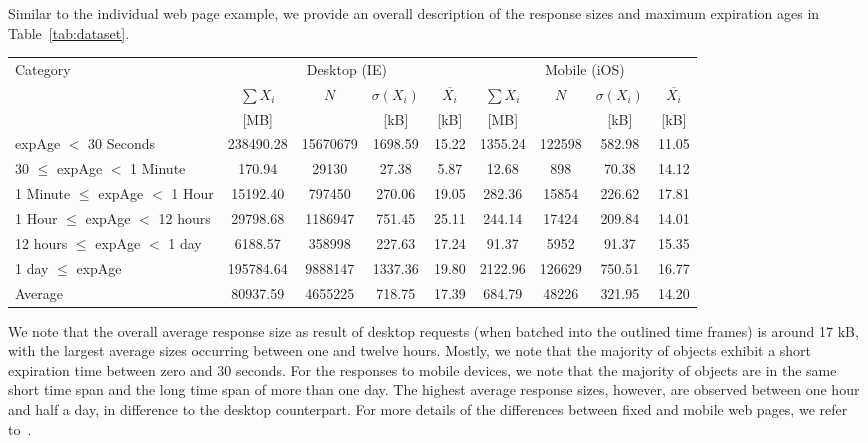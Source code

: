 Similar to the individual web page example, we provide an overall description of the response sizes and maximum expiration ages in Table~\ref{tab:dataset}.
\begin{table*}
\centering
\caption{Overview of the large dataset characteristics for all pages and response objects with a focus on the cache lifetime.}
\label{tab:dataset}
\begin{tabular}{|l||c|c|c|c||c|c|c|c|}
	\hline
	Category                         & \multicolumn{4}{|c||}{Desktop (IE)}                       & \multicolumn{4}{|c|}{Mobile (iOS)}                      \\
	                                 & $\sum X_i $ &   $N$    & $\sigma(X_i)$ & $\overline{X_i}$ & $\sum X_i $ &  $N$   & $\sigma(X_i)$ & $\overline{X_i}$ \\
	                                 &    [MB]     &          &     [kB]      &       [kB]       &    [MB]     &        &     [kB]      &       [kB]       \\ \hline\hline
	expAge $<$ 30 Seconds            &  238490.28  & 15670679 &    1698.59    &      15.22       &   1355.24   & 122598 &    582.98     &      11.05       \\ \hline
	30 $\le$ expAge $<$ 1 Minute     &   170.94    &  29130   &     27.38     &       5.87       &    12.68    &  898   &     70.38     &      14.12       \\ \hline
	1 Minute $\le$ expAge $<$ 1 Hour &  15192.40   &  797450  &    270.06     &      19.05       &   282.36    & 15854  &    226.62     &      17.81       \\ \hline
	1 Hour $\le$ expAge $<$ 12 hours &  29798.68   & 1186947  &    751.45     &      25.11       &   244.14    & 17424  &    209.84     &      14.01       \\ \hline
	12 hours $\le$ expAge $<$ 1 day  &   6188.57   &  358998  &    227.63     &      17.24       &    91.37    &  5952  &     91.37     &      15.35       \\ \hline
	1 day $\le$ expAge               &  195784.64  & 9888147  &    1337.36    &      19.80       &   2122.96   & 126629 &    750.51     &      16.77       \\ \hline\hline
	Average                          &  80937.59   & 4655225  &    718.75     &      17.39       &   684.79    & 48226  &    321.95     &      14.20       \\ \hline
\end{tabular}
\end{table*}
We note that the overall average response size as result of desktop requests (when batched into the outlined time frames) is around 17 kB, with the largest average sizes occurring between one and twelve hours.
Mostly, we note that the majority of objects exhibit a short expiration time between zero and 30 seconds.
For the responses to mobile devices, we note that the majority of objects are in the same short time span and the long time span of more than one day.
The highest average response sizes, however, are observed between one hour and half a day, in difference to the desktop counterpart.
For more details of the differences between fixed and mobile web pages, we refer to~\cite{JoSe14Commag}.

